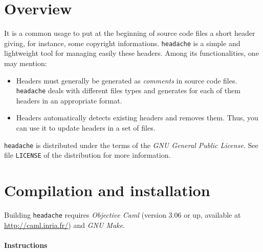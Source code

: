 \documentclass{vs-article}
\title{\headache{}}
\author{Vincent Simonet}
\date{November, 2002}
\newcommand{\headache}{\texttt{headache}}
\begin{document}
\maketitle


\section{Overview}

It is a common usage to put at the beginning of source code files a
short header giving, for instance, some copyright informations.
\headache{} is a simple and lightweight tool for managing easily these
headers.  Among its functionalities, one may mention:
\begin{itemize}
\item Headers must generally be generated as \emph{comments} in source
  code files.  \headache{} deals with different files types and generates
  for each of them headers in an appropriate format.
\item Headers automatically detects existing headers and removes them.
  Thus, you can use it to update headers in a set of files.
\end{itemize}
\headache{} is distributed under the terms of the \emph{GNU General
  Public License}.  See file \verb+LICENSE+ of the distribution for
more information.


\section{Compilation and installation}

Building \headache{} requires \emph{Objective Caml} (version 3.06 or up,
available at \url{http://caml.inria.fr/}) and \emph{GNU Make}.  

\paragraph{Instructions}
\end{document}
